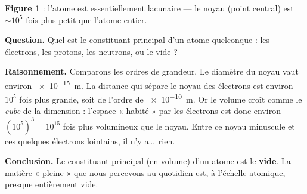 \documentclass[11pt,a4paper]{article}
\begin{document}
\begin{center}
\end{center}
\vspace{-0.6em}
\begin{center}\small\textbf{\textcolor{primary}{Figure 1}} : l'atome est essentiellement lacunaire — le noyau (point central) est $\sim 10^5$ fois plus petit que l'atome entier.\end{center}

\begin{exemple}
\textbf{Question.} Quel est le constituant principal d'un atome quelconque : les électrons, les protons,
les neutrons, ou le vide ?

\smallskip
\textbf{Raisonnement.} Comparons les ordres de grandeur. Le diamètre du noyau vaut environ
\SI{e-15}{\metre}. La distance qui sépare le noyau des électrons est environ \(10^5\) fois plus grande,
soit de l'ordre de \SI{e-10}{\metre}. Or le volume croît comme le \emph{cube} de la dimension : l'espace
« habité » par les électrons est donc environ \((10^5)^3 = 10^{15}\) fois plus volumineux que le noyau.
Entre ce noyau minuscule et ces quelques électrons lointains, il n'y a\dots\ rien.

\smallskip
\textbf{Conclusion.} Le constituant principal (en volume) d'un atome est le \textbf{vide}. La matière
« pleine » que nous percevons au quotidien est, à l'échelle atomique, presque entièrement vide.
\end{exemple}
\end{document}
